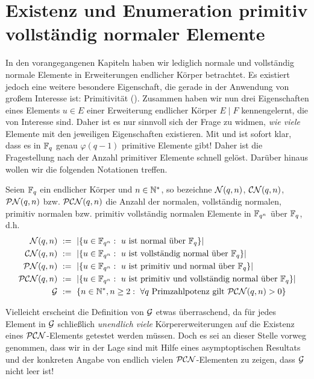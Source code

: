 \chapter{Existenz und Enumeration primitiv vollständig normaler Elemente}
\label{chap:existenz_und_enumeration}

In den vorangegangenen Kapiteln haben wir lediglich normale und vollständig
normale Elemente in Erweiterungen endlicher Körper betrachtet. Es existiert
jedoch eine weitere besondere Eigenschaft, die gerade in der Anwendung von
großem Interesse ist: Primitivität (). Zusammen haben wir
nun drei Eigenschaften eines Elements $u \in E$ einer Erweiterung endlicher
Körper $E\mid F$ kennengelernt, die von Interesse sind. Daher ist es nur
sinnvoll sich der Frage zu widmen, \emph{wie viele} Elemente mit den jeweiligen
Eigenschaften existieren. Mit  und 
 ist sofort klar, dass es in
$\F_q$ genau $\varphi(q-1)$ primitive Elemente gibt! Daher ist die
Fragestellung nach der Anzahl primitiver Elemente schnell gelöst. Darüber
hinaus wollen wir die folgenden Notationen treffen.

\begin{definition}
  Seien $\F_q$ ein endlicher Körper und $n \in \N^\ast$, so bezeichne
  $\cal N(q,n)$, $\CN(q,n)$, $\PN(q,n)$ bzw. $\PCN(q,n)$ die Anzahl der 
  normalen, vollständig normalen, primitiv normalen bzw. primitiv vollständig
  normalen Elemente in $\F_{q^n}$ über $\F_q$, d.h.
  \begin{align*}
    \cal N(q,n) &\speq{:=} 
      |\{ u \in \F_{q^n}:\ u\text{ ist normal über }\F_q\}| \\
    \CN(q,n) &\speq{:=} 
      |\{ u \in \F_{q^n}:\ u\text{ ist vollständig normal über }\F_q\}| \\
    \PN(q,n) &\speq{:=} 
      |\{ u \in \F_{q^n}:\ u\text{ ist primitiv und normal über }\F_q\}| \\
    \PCN(q,n) &\speq{:=} 
      |\{ u \in \F_{q^n}:\ u\text{ ist primitiv und vollständig 
      normal über }\F_q\}| \\
    \G &\speq{:=} 
      \{ n\in \N^\ast, n\geq 2:\ 
      \forall q\text{ Primzahlpotenz gilt } \PCN(q,n) > 0 \}
  \end{align*}
\end{definition}

Vielleicht erscheint die Definition von $\G$ etwas überraschend, da für jedes
Element in $\G$ schließlich \emph{unendlich viele} Körpererweiterungen auf die
Existenz eines $\PCN$-Elements getestet werden müssen. Doch es sei an dieser
Stelle vorweg genommen, dass wir in der Lage sind mit Hilfe eines
asymptoptischen Resultats und der konkreten Angabe von endlich vielen
$\PCN$-Elementen zu zeigen, dass $\G$ nicht leer ist!

